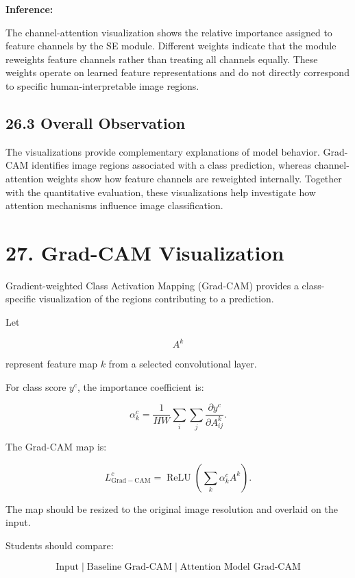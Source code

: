 \documentclass[10pt]{article}
\begin{document}
\noindent\textbf{Inference:}

The channel-attention visualization shows the relative importance
assigned to feature channels by the SE module. Different weights
indicate that the module reweights feature channels rather than
treating all channels equally. These weights operate on learned
feature representations and do not directly correspond to specific
human-interpretable image regions.

\subsection*{26.3 Overall Observation}

The visualizations provide complementary explanations of model
behavior. Grad-CAM identifies image regions associated with a
class prediction, whereas channel-attention weights show how
feature channels are reweighted internally. Together with the
quantitative evaluation, these visualizations help investigate
how attention mechanisms influence image classification.

\section*{27. Grad-CAM Visualization}

Gradient-weighted Class Activation Mapping (Grad-CAM) provides a
class-specific visualization of the regions contributing to a prediction.

Let

\[
A^k
\]

represent feature map $k$ from a selected convolutional layer.

For class score $y^c$, the importance coefficient is:

\[
\alpha_k^c
=
\frac{1}{HW}
\sum_i
\sum_j
\frac{\partial y^c}
{\partial A_{ij}^k}.
\]

The Grad-CAM map is:

\[
L_{\mathrm{Grad-CAM}}^c
=
\operatorname{ReLU}
\left(
\sum_k
\alpha_k^c A^k
\right).
\]

The map should be resized to the original image resolution and overlaid on
the input.

Students should compare:

\[
\boxed{
\text{Input}
\;|\;
\text{Baseline Grad-CAM}
\;|\;
\text{Attention Model Grad-CAM}
}
\]
\end{document}
